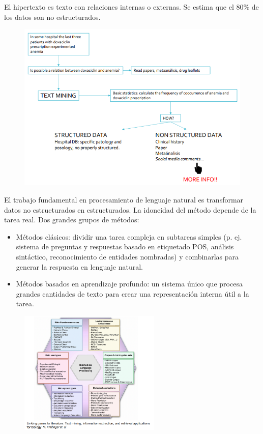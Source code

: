 El hipertexto es texto con relaciones internas o externas. Se estima que el 80\% de los datos son no estructurados.

\begin{figure}[h]
\centering
\includegraphics[width = \textwidth]{figs/ej-mineria.png}
\end{figure}

El trabajo fundamental en procesamiento de lenguaje natural es transformar datos no estructurados en estructurados. La idoneidad del método depende de la tarea real.
Dos grandes grupos de métodos:
\begin{itemize}
\item Métodos clásicos: dividir una tarea compleja en subtareas simples (p. ej. sistema de preguntas y respuestas basado en etiquetado POS, análisis sintáctico, reconocimiento de entidades nombradas) y combinarlas para generar la respuesta en lenguaje natural.
\item Métodos basados en aprendizaje profundo: un sistema único que procesa grandes cantidades de texto para crear una representación interna útil a la tarea.
\end{itemize}

\begin{figure}[h]
\centering
\includegraphics[width = 0.6\textwidth]{figs/blp.png}
\end{figure}

